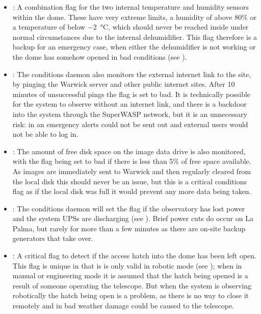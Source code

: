 \begin{colsection}
\begin{itemize}
    \item {}: A combination flag for the two internal temperature and humidity sensors within the dome. These have very extreme limits, a humidity of above 80\% or a temperature of below \SI{-2}{\celsius}, which should never be reached inside under normal circumstances due to the internal dehumidifier. This flag therefore is a backup for an emergency case, when either the dehumidifier is not working or the dome has somehow opened in bad conditions (see ).

    \item {}: The conditions daemon also monitors the external internet link to the site, by pinging the Warwick server and other public internet sites. After 10 minutes of unsuccessful pings the flag is set to bad. It is technically possible for the system to observe without an internet link, and there is a backdoor into the system through the SuperWASP network, but it is an unnecessary risk: in an emergency alerts could not be sent out and external users would not be able to log in.

    \item {}: The amount of free disk space on the image data drive is also monitored, with the flag being set to bad if there is less than 5\% of free space available. As images are immediately sent to Warwick and then regularly cleared from the local disk this should never be an issue, but this is a critical conditions flag as if the local disk was full it would prevent any more data being taken.

    \item {}: The conditions daemon will set the  flag if the observatory has lost power and the system UPSs are discharging (see ). Brief power cuts do occur on La Palma, but rarely for more than a few minutes as there are on-site backup generators that take over.

    \item {}: A critical flag to detect if the access hatch into the dome has been left open. This flag is unique in that is is only valid in robotic mode (see ); when in manual or engineering mode it is assumed that the hatch being opened is a result of someone operating the telescope. But when the system is observing robotically the hatch being open is a problem, as there is no way to close it remotely and in bad weather damage could be caused to the telescope.
\end{itemize}


\end{colsection}
